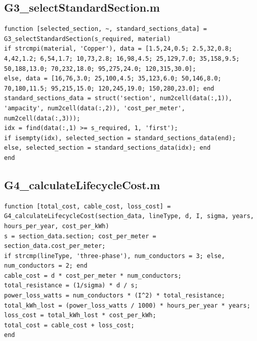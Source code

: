 \documentclass[12pt, a4paper]{article}
\begin{document}
\subsection{G3\_selectStandardSection.m}
\begin{lstlisting}[caption={Selects the next available standard conductor section from a table.}, label={lst:G3}]
function [selected_section, ~, standard_sections_data] = G3_selectStandardSection(s_required, material)
if strcmpi(material, 'Copper'), data = [1.5,24,0.5; 2.5,32,0.8; 4,42,1.2; 6,54,1.7; 10,73,2.8; 16,98,4.5; 25,129,7.0; 35,158,9.5; 50,188,13.0; 70,232,18.0; 95,275,24.0; 120,315,30.0];
else, data = [16,76,3.0; 25,100,4.5; 35,123,6.0; 50,146,8.0; 70,180,11.5; 95,215,15.0; 120,245,19.0; 150,280,23.0]; end
standard_sections_data = struct('section', num2cell(data(:,1)), 'ampacity', num2cell(data(:,2)), 'cost_per_meter', num2cell(data(:,3)));
idx = find(data(:,1) >= s_required, 1, 'first');
if isempty(idx), selected_section = standard_sections_data(end);
else, selected_section = standard_sections_data(idx); end
end
\end{lstlisting}

\subsection{G4\_calculateLifecycleCost.m}
\begin{lstlisting}[caption={Calculates the lifecycle cost (initial + losses) for a given section.}, label={lst:G4}]
function [total_cost, cable_cost, loss_cost] = G4_calculateLifecycleCost(section_data, lineType, d, I, sigma, years, hours_per_year, cost_per_kWh)
s = section_data.section; cost_per_meter = section_data.cost_per_meter;
if strcmp(lineType, 'three-phase'), num_conductors = 3; else, num_conductors = 2; end
cable_cost = d * cost_per_meter * num_conductors;
total_resistance = (1/sigma) * d / s;
power_loss_watts = num_conductors * (I^2) * total_resistance;
total_kWh_lost = (power_loss_watts / 1000) * hours_per_year * years;
loss_cost = total_kWh_lost * cost_per_kWh;
total_cost = cable_cost + loss_cost;
end
\end{lstlisting}
\end{document}

